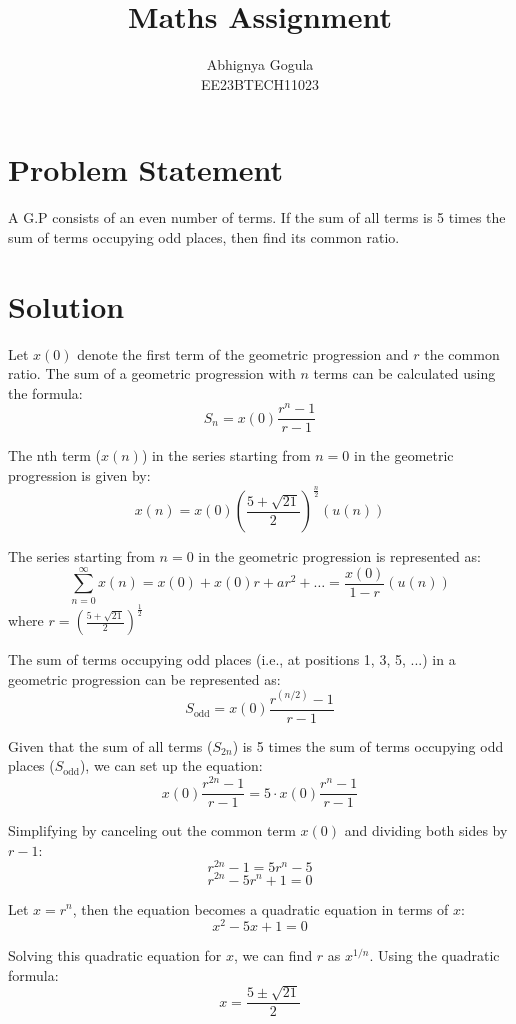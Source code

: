 \documentclass{article}
\begin{document}
\title{Maths Assignment}
\author{Abhignya Gogula\\
        EE23BTECH11023}
\maketitle

\section*{Problem Statement}
A G.P consists of an even number of terms. If the sum of all terms is 5 times the sum of terms occupying odd places, then find its common ratio.

\section*{Solution}
Let \( x(0) \) denote the first term of the geometric progression and \( r \) the common ratio. The sum of a geometric progression with \( n \) terms can be calculated using the formula:
\[ S_n = x(0) \frac{{r^n - 1}}{{r - 1}} \]

The nth term (\(x(n)\)) in the series starting from \(n = 0\) in the geometric progression is given by:
\[ x(n) = x(0)  \left(\frac{{5 + \sqrt{21}}}{2}\right)^{\frac{n}{2}}  (u(n))\]

The series starting from \(n = 0\) in the geometric progression is represented as:
\[ \sum_{n=0}^{\infty} x(n) = x(0) + x(0)  r + a r^2 + \dots = \frac{x(0)}{1 - r}  (u(n))\]
where \( r = \left(\frac{{5 + \sqrt{21}}}{2}\right)^{\frac{1}{2}} \)

The sum of terms occupying odd places (i.e., at positions 1, 3, 5, ...) in a geometric progression can be represented as:
\[ S_{\text{odd}} = x(0) \frac{{r^{(n/2)} - 1}}{{r - 1}} \]

Given that the sum of all terms (\( S_{2n} \)) is 5 times the sum of terms occupying odd places (\( S_{\text{odd}} \)), we can set up the equation:
\[ x(0) \frac{{r^{2n} - 1}}{{r - 1}} = 5 \cdot  x(0) \frac{{r^n - 1}}{{r - 1}} \]

Simplifying by canceling out the common term \( x(0) \) and dividing both sides by \( r - 1 \):
\[ r^{2n} - 1 = 5 r^n - 5 \]
\[ r^{2n} - 5  r^n + 1 = 0 \]

Let \( x = r^n \), then the equation becomes a quadratic equation in terms of \( x \):
\[ x^2 - 5x + 1 = 0 \]

Solving this quadratic equation for \( x \), we can find \( r \) as \( x^{1/n} \). Using the quadratic formula:
\[ x = \frac{{5 \pm \sqrt{21}}}{2} \]
\end{document}

